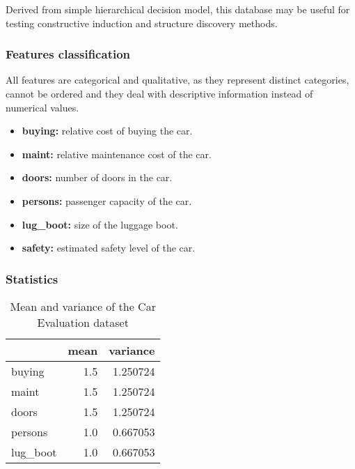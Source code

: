 Derived from simple hierarchical decision model, this database may be useful
for testing constructive induction and structure discovery methods. 

\subsubsection{Features classification}

All features are categorical and qualitative, as they represent distinct
categories, cannot be ordered and they deal with descriptive information instead
of numerical values.

\begin{itemize}
    \item \textbf{buying:} relative cost of buying the car.
    \item \textbf{maint:} relative maintenance cost of the car.
    \item \textbf{doors:} number of doors in the car.
    \item \textbf{persons:} passenger capacity of the car.
    \item \textbf{lug\_boot:} size of the luggage boot.
    \item \textbf{safety:} estimated safety level of the car.
\end{itemize}

\subsubsection{Statistics}

\begin{table}[!h]
    \begin{center}
        \begin{tabular}{lrr}
            \toprule
            {} &    mean & variance \\
            \midrule
            buying   &  1.5 &  1.250724  \\
            maint    &  1.5 &  1.250724  \\
            doors    &  1.5 &  1.250724  \\
            persons  &  1.0 &  0.667053 \\
            lug\_boot &  1.0 &  0.667053  \\
            \bottomrule
        \end{tabular}
        \caption{Mean and variance of the Car Evaluation dataset}
    \end{center}
\end{table}

